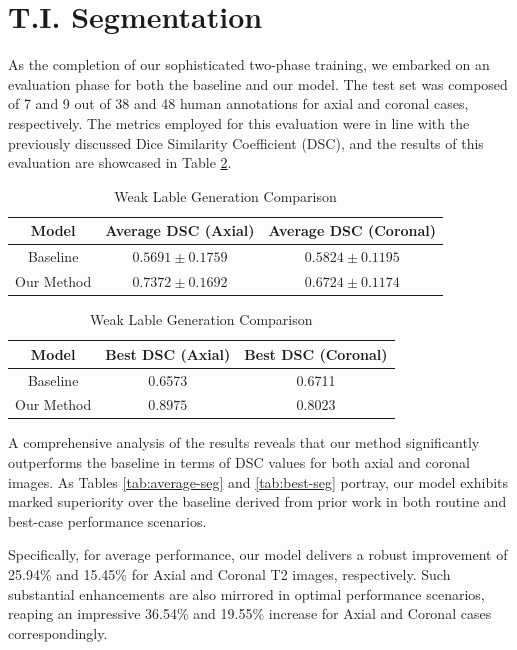 \section{T.I. Segmentation}
As the completion of our sophisticated two-phase training, we embarked on an evaluation phase for both the baseline and our model. The test set was composed of 7 and 9 out of 38 and 48 human annotations for axial and coronal cases, respectively. The metrics employed for this evaluation were in line with the previously discussed Dice Similarity Coefficient (DSC), and the results of this evaluation are showcased in Table \ref{tab:seg}. 
\begin{table}[ht]
    \begin{subtable}[b]{\textwidth}
        \centering
        \begin{tabular}{c | c | c}
        Model & Average DSC (Axial) & Average DSC (Coronal) \\
        \hline
        Baseline & \(0.5691 \pm 0.1759\)  & \(0.5824 \pm 0.1195\)\\
        \hline
        Our Method & \(\mathbf{0.7372 \pm 0.1692}\) & \(\mathbf{0.6724 \pm 0.1174}\) 
       \end{tabular}
       \caption{Average Case Comparison}
       \label{tab:average-seg}
    \end{subtable}
    \vfill
    \begin{subtable}[b]{\textwidth}
        \centering
        \begin{tabular}{c | c | c}
        Model & Best DSC (Axial) & Best DSC (Coronal) \\
        \hline
        Baseline & 0.6573 & 0.6711\\
        \hline
        Our Method & \(\mathbf{0.8975}\) & \(\mathbf{0.8023}\)
       \end{tabular}
       \caption{Best Case Comparison}
       \label{tab:best-seg}
    \end{subtable}
     \caption{Weak Lable Generation Comparison}
     \label{tab:seg}
\end{table}

A comprehensive analysis of the results reveals that our method significantly outperforms the baseline in terms of DSC values for both axial and coronal images. As Tables \ref{tab:average-seg} and \ref{tab:best-seg} portray, our model exhibits marked superiority over the baseline derived from prior work in both routine and best-case performance scenarios.

Specifically, for average performance, our model delivers a robust improvement of 25.94\% and 15.45\% for Axial and Coronal T2 images, respectively. Such substantial enhancements are also mirrored in optimal performance scenarios, reaping an impressive 36.54\% and 19.55\% increase for Axial and Coronal cases correspondingly.

